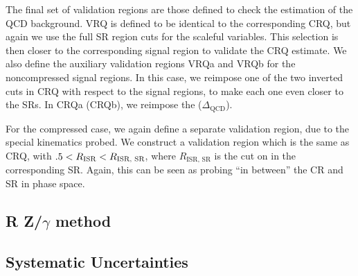 The final set of validation regions are those defined to check the estimation of the QCD background.
VRQ is defined to be identical to the corresponding CRQ, but again we use the full SR region cuts for the scaleful variables.
This selection is then closer to the corresponding signal region to validate the CRQ estimate.
We also define the auxiliary validation regions VRQa and VRQb for the noncompressed signal regions.
In this case, we reimpose one of the two inverted cuts in CRQ with respect to the signal regions, to make each one even closer to the SRs.
In CRQa (CRQb), we reimpose the  ($\Delta_{\mathrm{QCD}}$).

For the compressed case, we again define a separate validation region, due to the special kinematics probed.
We construct a validation region which is the same as CRQ, with $.5 < R_{\text{ISR}} < R_{\text{ISR, SR}}$, where $R_{\text{ISR, SR}}$ is the cut on \risr in the corresponding SR.
Again, this can be seen as probing ``in between'' the CR and SR in phase space.


\subsection{R Z/$\gamma$ method}

\subsection{Systematic Uncertainties}
